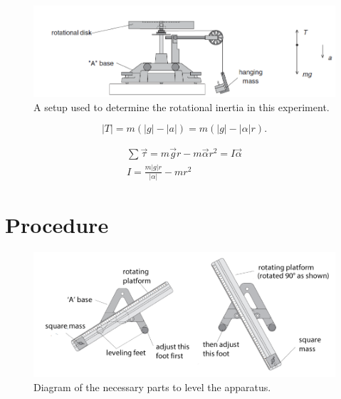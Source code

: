 \begin{figure}[h]
	\begin{center}
	\includegraphics[width=01.0\textwidth]{./Exp6/pic/diskwithmass.png}
	\end{center}
	\caption{A setup used to determine the rotational inertia in this experiment.}
	\label{fig:initsetup}
\end{figure}


\begin{equation}
|T| = m(|g|- |a|) = m(|g|-|\alpha| r).
\end{equation}


\begin{gather}
\sum \vec \tau = m\vec gr - m \vec \alpha r^{2} = I \vec \alpha \\
I = \frac{m|g|r}{|\alpha|} - mr^2
\end{gather}

\myskip

\section{Procedure}
\label{angexp}

\begin{figure}[!h]
	\begin{center}
	\includegraphics[width=1.0\textwidth]{./Exp6/pic/appbalance2.png}
	\end{center}
\caption{Diagram of the necessary parts to level the apparatus.}
\label{fig:levelapp}
\end{figure}


